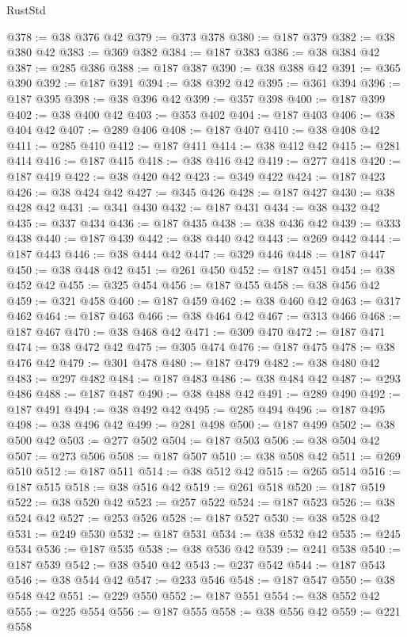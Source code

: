 \begin{lexlean}{RustStd}
\begin{coremodule}
@378 := @38 @376 @42
@379 := @373 @378
@380 := @187 @379
@382 := @38 @380 @42
@383 := @369 @382
@384 := @187 @383
@386 := @38 @384 @42
@387 := @285 @386
@388 := @187 @387
@390 := @38 @388 @42
@391 := @365 @390
@392 := @187 @391
@394 := @38 @392 @42
@395 := @361 @394
@396 := @187 @395
@398 := @38 @396 @42
@399 := @357 @398
@400 := @187 @399
@402 := @38 @400 @42
@403 := @353 @402
@404 := @187 @403
@406 := @38 @404 @42
@407 := @289 @406
@408 := @187 @407
@410 := @38 @408 @42
@411 := @285 @410
@412 := @187 @411
@414 := @38 @412 @42
@415 := @281 @414
@416 := @187 @415
@418 := @38 @416 @42
@419 := @277 @418
@420 := @187 @419
@422 := @38 @420 @42
@423 := @349 @422
@424 := @187 @423
@426 := @38 @424 @42
@427 := @345 @426
@428 := @187 @427
@430 := @38 @428 @42
@431 := @341 @430
@432 := @187 @431
@434 := @38 @432 @42
@435 := @337 @434
@436 := @187 @435
@438 := @38 @436 @42
@439 := @333 @438
@440 := @187 @439
@442 := @38 @440 @42
@443 := @269 @442
@444 := @187 @443
@446 := @38 @444 @42
@447 := @329 @446
@448 := @187 @447
@450 := @38 @448 @42
@451 := @261 @450
@452 := @187 @451
@454 := @38 @452 @42
@455 := @325 @454
@456 := @187 @455
@458 := @38 @456 @42
@459 := @321 @458
@460 := @187 @459
@462 := @38 @460 @42
@463 := @317 @462
@464 := @187 @463
@466 := @38 @464 @42
@467 := @313 @466
@468 := @187 @467
@470 := @38 @468 @42
@471 := @309 @470
@472 := @187 @471
@474 := @38 @472 @42
@475 := @305 @474
@476 := @187 @475
@478 := @38 @476 @42
@479 := @301 @478
@480 := @187 @479
@482 := @38 @480 @42
@483 := @297 @482
@484 := @187 @483
@486 := @38 @484 @42
@487 := @293 @486
@488 := @187 @487
@490 := @38 @488 @42
@491 := @289 @490
@492 := @187 @491
@494 := @38 @492 @42
@495 := @285 @494
@496 := @187 @495
@498 := @38 @496 @42
@499 := @281 @498
@500 := @187 @499
@502 := @38 @500 @42
@503 := @277 @502
@504 := @187 @503
@506 := @38 @504 @42
@507 := @273 @506
@508 := @187 @507
@510 := @38 @508 @42
@511 := @269 @510
@512 := @187 @511
@514 := @38 @512 @42
@515 := @265 @514
@516 := @187 @515
@518 := @38 @516 @42
@519 := @261 @518
@520 := @187 @519
@522 := @38 @520 @42
@523 := @257 @522
@524 := @187 @523
@526 := @38 @524 @42
@527 := @253 @526
@528 := @187 @527
@530 := @38 @528 @42
@531 := @249 @530
@532 := @187 @531
@534 := @38 @532 @42
@535 := @245 @534
@536 := @187 @535
@538 := @38 @536 @42
@539 := @241 @538
@540 := @187 @539
@542 := @38 @540 @42
@543 := @237 @542
@544 := @187 @543
@546 := @38 @544 @42
@547 := @233 @546
@548 := @187 @547
@550 := @38 @548 @42
@551 := @229 @550
@552 := @187 @551
@554 := @38 @552 @42
@555 := @225 @554
@556 := @187 @555
@558 := @38 @556 @42
@559 := @221 @558

\end{coremodule}
\end{lexlean}
